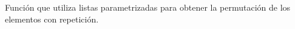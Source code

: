 Función que utiliza listas parametrizadas para obtener la permutación de los elementos con repetición.